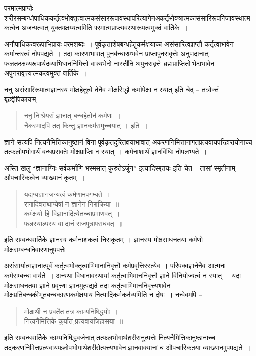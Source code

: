 {परमात्मप्राप्तेः शरीरसम्बन्धोपाधिककर्तृत्वभोक्तृत्वात्मकसंसाररूपावस्थापरित्यागेन\break अकर्तृभोक्त्रात्मकासंसारिरूपनिजावस्थात्मकत्वेन अजन्यत्वात् युक्तमक्षय्यत्वमिति परमात्म\-प्राप्त्यवस्थारूपत्वमुक्तं वार्तिके~। 

अनौपाधिकत्वरूपाभिप्रायः परमशब्दः~। पूर्वकृताशेषबन्धहेतुकर्मक्षयाच्च असंसारित्व\-प्राप्तौ कर्तृत्वाभावेन कर्मान्तरत्वं नोपपद्यते~। तदा कारणाभावात् पुनर्बन्धासम्भवेन प्राप्तापुनरावृत्तेः अनुपादानात् फलतदक्षय्यरूपार्थद्रव्याभिधाननिमित्तो वाक्यभेदो नास्तीति अपुनरावृत्तेः ब्रह्मप्राप्तितो भेदाभावेन अपुनरावृत्त्यात्मकत्वमुक्तं वार्तिके~। 

ननु असंसारिरूपात्मज्ञानस्य मोक्षहेतुत्वे तेनैव मोक्षसिद्धौ कर्मापेक्षा न स्यात् इति चेत् – तत्रोक्तं बृहद्दीपिकायाम् –
\begin{verse}
ननु निःश्रेयसं ज्ञानात् बन्धहेतोर्न कर्मणः~। \\
नैकस्मादपि तत् किन्तु ज्ञानकर्मसमुच्चयात्~॥ इति~। 
\end{verse}
ज्ञाने सत्यपि नित्यनैमित्तिकानुष्ठानं विना पूर्वकृतदुरितक्षयाभावात् अकरणनिमित्तानागत\-प्रत्यवायपरिहारायोगाच्च तत्फलोपभोगार्थं बन्धप्रसक्तेः मोक्षप्राप्तिः न स्यात्~। कर्मनाशार्थं ज्ञानविधिः नोपलभ्यते~। 

अस्ति खलु “ज्ञानाग्निः सर्वकर्माणि भस्मसात् कुरुतेऽर्जुन” इत्यादिस्मृतयः इति चेत् – तासां स्मृतीनाम् औपचारिकत्वेन व्याख्यानं कृतम्~। 
\begin{verse}
यद्यप्यज्ञानजन्यत्वं कर्मणामवगम्यते~। \\
रागादिवत्तथाप्येषां न ज्ञानेन निराक्रिया~॥\\
कर्मक्षयो हि विज्ञानादित्येतच्चाप्रमाणवत्~। \\
फलस्याल्पस्य वा दानं राजपुत्रापराधवत्~॥
\end{verse}
इति सम्बन्धवार्तिके ज्ञानस्य कर्मनाशकत्वं निराकृतम्~। ज्ञानस्य मोक्षसाधनतया कर्मणो मोक्षसम्बन्धनिवारणानुपपत्तेः~। 

असंसार्यात्मज्ञानात्पूर्वं कर्तृत्वभोक्तृत्वाभिमानानिवृत्तौ कर्मप्रवृत्तिरस्त्येव~। परिपक्वज्ञानेनैव आत्मनः कर्मसम्बन्धः वार्यते~। अन्यथा विधानावस्थायां कर्तृत्वाभिमाननिवृत्तौ ज्ञाने विनियोज्यत्वं न स्यात्~। यदा मोक्षसाधनतया ज्ञाने प्रवृत्त्या ज्ञानमुत्पद्यते तदा कर्तृत्वाभिमाननिवृत्त्यभावेन मोक्षप्रतिबन्धकीभूतबन्धकारणकर्मक्षयाय नित्यादिकर्मकर्तव्यमिति न दोषः~। नन्वेवमपि –
\begin{verse}
मोक्षार्थी न प्रवर्तेत तत्र काम्यनिषिद्धयोः~। \\
नित्यनैमित्तिके कुर्यात् प्रत्यवायजिहासया~॥
\end{verse}
इति सम्बन्धवार्तिके काम्यनिषिद्धवर्जनात् तत्फलभोगार्थशरीरानुत्पत्तेः नित्यनैमित्तिकानुष्ठानाच्च तदकरणनिमित्तप्रत्यवायफलोपभोगार्थशरीरोत्पत्त्यभावेन ज्ञानवाक्यानां च औपचारिकतया व्याख्यानमुपपद्यते~। 

}
